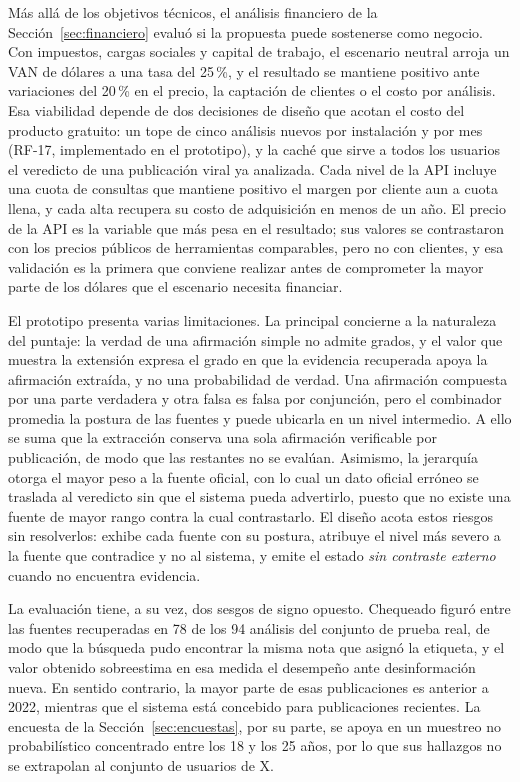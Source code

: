 Más allá de los objetivos técnicos, el análisis financiero de la Sección~\ref{sec:financiero} evaluó si la propuesta puede sostenerse como negocio. Con impuestos, cargas sociales y capital de trabajo, el escenario neutral arroja un VAN de \finNeuVan{} dólares a una tasa del 25\,\%, y el resultado se mantiene positivo ante variaciones del 20\,\% en el precio, la captación de clientes o el costo por análisis. Esa viabilidad depende de dos decisiones de diseño que acotan el costo del producto gratuito: un tope de cinco análisis nuevos por instalación y por mes (RF-17, implementado en el prototipo), y la caché que sirve a todos los usuarios el veredicto de una publicación viral ya analizada. Cada nivel de la API incluye una cuota de consultas que mantiene positivo el margen por cliente aun a cuota llena, y cada alta recupera su costo de adquisición en menos de un año. El precio de la API es la variable que más pesa en el resultado; sus valores se contrastaron con los precios públicos de herramientas comparables, pero no con clientes, y esa validación es la primera que conviene realizar antes de comprometer la mayor parte de los \finNeuNecesidad{} dólares que el escenario necesita financiar.

El prototipo presenta varias limitaciones. La principal concierne a la naturaleza del puntaje: la verdad de una afirmación simple no admite grados, y el valor que muestra la extensión expresa el grado en que la evidencia recuperada apoya la afirmación extraída, y no una probabilidad de verdad. Una afirmación compuesta por una parte verdadera y otra falsa es falsa por conjunción, pero el combinador promedia la postura de las fuentes y puede ubicarla en un nivel intermedio. A ello se suma que la extracción conserva una sola afirmación verificable por publicación, de modo que las restantes no se evalúan. Asimismo, la jerarquía otorga el mayor peso a la fuente oficial, con lo cual un dato oficial erróneo se traslada al veredicto sin que el sistema pueda advertirlo, puesto que no existe una fuente de mayor rango contra la cual contrastarlo. El diseño acota estos riesgos sin resolverlos: exhibe cada fuente con su postura, atribuye el nivel más severo a la fuente que contradice y no al sistema, y emite el estado \textit{sin contraste externo} cuando no encuentra evidencia.

La evaluación tiene, a su vez, dos sesgos de signo opuesto. Chequeado figuró entre las fuentes recuperadas en 78 de los 94 análisis del conjunto de prueba real, de modo que la búsqueda pudo encontrar la misma nota que asignó la etiqueta, y el valor obtenido sobreestima en esa medida el desempeño ante desinformación nueva. En sentido contrario, la mayor parte de esas publicaciones es anterior a 2022, mientras que el sistema está concebido para publicaciones recientes. La encuesta de la Sección~\ref{sec:encuestas}, por su parte, se apoya en un muestreo no probabilístico concentrado entre los 18 y los 25 años, por lo que sus hallazgos no se extrapolan al conjunto de usuarios de X.


